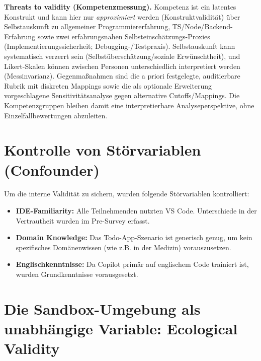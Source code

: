 \noindent \textbf{Threats to validity (Kompetenzmessung).} Kompetenz ist ein latentes Konstrukt und kann hier nur \emph{approximiert} werden (Konstruktvalidit\"at) \textendash{} \"uber Selbstauskunft zu allgemeiner Programmiererfahrung, TS/Node/Backend-Erfahrung sowie zwei erfahrungsnahen Selbsteinsch\"atzungs-Proxies (Implementierungssicherheit; Debugging-/Testpraxis). Selbstauskunft kann systematisch verzerrt sein (Selbst\"ubersch\"atzung/soziale Erw\"unschtheit), und Likert-Skalen k\"onnen zwischen Personen unterschiedlich interpretiert werden (Messinvarianz). Gegenma\ss{}nahmen sind die a priori festgelegte, auditierbare Rubrik mit diskreten Mappings sowie die als optionale Erweiterung vorgeschlagene Sensitivit\"atsanalyse gegen alternative Cutoffs/Mappings. Die Kompetenzgruppen bleiben damit eine interpretierbare Analyseperspektive, ohne Einzelfallbewertungen abzuleiten.

\section{Kontrolle von Störvariablen (Confounder)}
Um die interne Validität zu sichern, wurden folgende Störvariablen kontrolliert:
\begin{itemize}
    \item  \textbf{IDE-Familiarity:} Alle Teilnehmenden nutzten VS Code. Unterschiede in der Vertrautheit wurden im Pre-Survey erfasst.
    \item  \textbf{Domain Knowledge:} Das Todo-App-Szenario ist generisch genug, um kein spezifisches Domänenwissen (wie z.B. in der Medizin) vorauszusetzen.
    \item  \textbf{Englischkenntnisse:} Da Copilot primär auf englischem Code trainiert ist, wurden Grundkenntnisse vorausgesetzt.
\end{itemize}

\section{Die Sandbox-Umgebung als unabhängige Variable: Ecological Validity}

